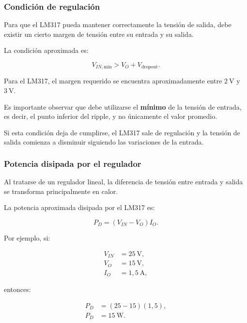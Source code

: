 \documentclass[12pt,a4paper]{article}
\begin{document}
	\subsubsection{Condición de regulación}
	
	Para que el LM317 pueda mantener correctamente la tensión de salida, debe existir
	un cierto margen de tensión entre su entrada y su salida.
	
	La condición aproximada es:
	
	\begin{equation}
		V_{IN,\mathrm{min}}
		>
		V_O
		+
		V_{\mathrm{dropout}}.
	\end{equation}
	
	Para el LM317, el margen requerido se encuentra aproximadamente entre
	$2~\text{V}$ y $3~\text{V}$.
	
	Es importante observar que debe utilizarse el \textbf{mínimo} de la tensión de
	entrada, es decir, el punto inferior del ripple, y no únicamente el valor promedio.
	
	Si esta condición deja de cumplirse, el LM317 sale de regulación y la tensión de
	salida comienza a disminuir siguiendo las variaciones de la entrada.
	
	\subsubsection{Potencia disipada por el regulador}
	
	Al tratarse de un regulador lineal, la diferencia de tensión entre entrada y
	salida se transforma principalmente en calor.
	
	La potencia aproximada disipada por el LM317 es:
	
	\begin{equation}
		P_D
		=
		(V_{IN}-V_O)I_O.
	\end{equation}
	
	Por ejemplo, si:
	
	\begin{align}
		V_{IN}&=25~\text{V},
		\\
		V_O&=15~\text{V},
		\\
		I_O&=1,5~\text{A},
	\end{align}
	
	entonces:
	
	\begin{align}
		P_D
		&=
		(25-15)(1,5),
		\\
		P_D
		&=
		15~\text{W}.
	\end{align}
	
\end{document}
